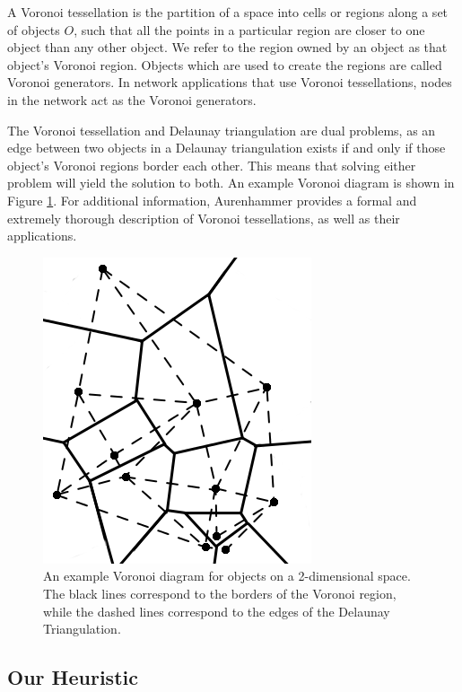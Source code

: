 A Voronoi tessellation is the partition of a space into cells or regions along a set of objects $O$, such that all the points in a particular region are closer to one object than any other object.  
We refer to the region owned by an object as that object's Voronoi region.
Objects which are used to create the regions are called Voronoi generators.
In network applications that use Voronoi tessellations, nodes in the network act as the Voronoi generators.

The Voronoi tessellation and Delaunay triangulation are dual problems, as an edge between two objects in a Delaunay triangulation exists if and only if those object's Voronoi regions border each other.  
This means that solving either problem will yield the solution to both.   
An example Voronoi diagram is shown in Figure \ref{voro-ex}.
For additional information, Aurenhammer \cite{voronoi} provides a formal and extremely thorough description of Voronoi tessellations, as well as their applications.


\begin{figure}
	\centering
	\includegraphics[width=0.75\linewidth]{voronoi}
	\caption{An example Voronoi diagram for objects on a 2-dimensional space.  The black lines correspond to the borders of the Voronoi region, while the dashed lines correspond to the edges of the Delaunay Triangulation.}
	\label{voro-ex}
\end{figure}



\subsection{Our Heuristic}




